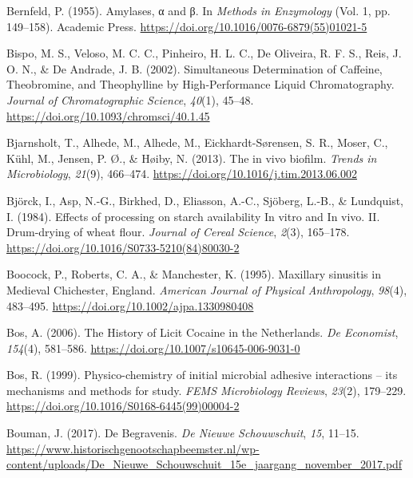\documentclass[
  letterpaper,
]{book}
\newlength{\cslhangindent}
\newlength{\cslentryspacingunit} %
\newenvironment{CSLReferences}[2] %
 {%
  \setlength{\parindent}{0pt}
  \ifodd #1
  \let\oldpar\par
  \def\par{\hangindent=\cslhangindent\oldpar}
  \fi
  \setlength{\parskip}{#2\cslentryspacingunit}
 }%
 {}
\begin{document}
\begin{CSLReferences}{1}{0}
\leavevmode{}%
Bernfeld, P. (1955). Amylases, α and β. In \emph{Methods in
{Enzymology}} (Vol. 1, pp. 149--158). {Academic Press}.
\url{https://doi.org/10.1016/0076-6879(55)01021-5}

\leavevmode{}%
Bispo, M. S., Veloso, M. C. C., Pinheiro, H. L. C., De Oliveira, R. F.
S., Reis, J. O. N., \& De Andrade, J. B. (2002). Simultaneous
{Determination} of {Caffeine}, {Theobromine}, and {Theophylline} by
{High-Performance Liquid Chromatography}. \emph{Journal of
Chromatographic Science}, \emph{40}(1), 45--48.
\url{https://doi.org/10.1093/chromsci/40.1.45}

\leavevmode{}%
Bjarnsholt, T., Alhede, M., Alhede, M., Eickhardt-Sørensen, S. R.,
Moser, C., Kühl, M., Jensen, P. Ø., \& Høiby, N. (2013). The in vivo
biofilm. \emph{Trends in Microbiology}, \emph{21}(9), 466--474.
\url{https://doi.org/10.1016/j.tim.2013.06.002}

\leavevmode{}%
Björck, I., Asp, N.-G., Birkhed, D., Eliasson, A.-C., Sjöberg, L.-B., \&
Lundquist, I. (1984). Effects of processing on starch availability {In}
vitro and {In} vivo. {II}. {Drum-drying} of wheat flour. \emph{Journal
of Cereal Science}, \emph{2}(3), 165--178.
\url{https://doi.org/10.1016/S0733-5210(84)80030-2}

\leavevmode{}%
Boocock, P., Roberts, C. A., \& Manchester, K. (1995). Maxillary
sinusitis in {Medieval Chichester}, {England}. \emph{American Journal of
Physical Anthropology}, \emph{98}(4), 483--495.
\url{https://doi.org/10.1002/ajpa.1330980408}

\leavevmode{}%
Bos, A. (2006). The {History} of {Licit Cocaine} in the {Netherlands}.
\emph{De Economist}, \emph{154}(4), 581--586.
\url{https://doi.org/10.1007/s10645-006-9031-0}

\leavevmode{}%
Bos, R. (1999). Physico-chemistry of initial microbial adhesive
interactions -- its mechanisms and methods for study. \emph{FEMS
Microbiology Reviews}, \emph{23}(2), 179--229.
\url{https://doi.org/10.1016/S0168-6445(99)00004-2}

\leavevmode{}%
Bouman, J. (2017). De Begravenis. \emph{De Nieuwe Schouwschuit},
\emph{15}, 11--15.
\url{https://www.historischgenootschapbeemster.nl/wp-content/uploads/De_Nieuwe_Schouwschuit_15e_jaargang_november_2017.pdf}


\end{CSLReferences}
\end{document}
